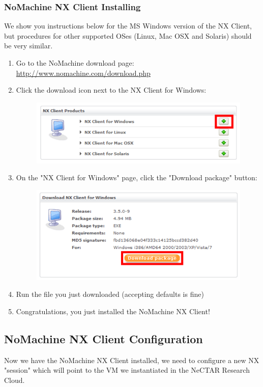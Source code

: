 \subsubsection{NoMachine NX Client Installing}
We show you instructions below for the MS Windows version of the NX Client, but
procedures for other supported OSes (Linux, Mac OSX and Solaris) should be very
similar.
\begin{enumerate}
  \item Go to the NoMachine download page: \url{http://www.nomachine.com/download.php}
  \item Click the download icon next to the NX Client for Windows:
  \begin{figure}[H]
    \centering
    \includegraphics[scale=0.5]{nx_client/download.png}
    \caption{\label{fig:nx_download}}
  \end{figure}
  \item On the "NX Client for Windows" page, click the "Download package" button:
  \begin{figure}[H]
    \centering
    \includegraphics[scale=0.5]{nx_client/download_package.png}
    \caption{\label{fig:nx_download_package}}
  \end{figure}
  \item Run the file you just downloaded (accepting defaults is fine)
  \item Congratulations, you just installed the NoMachine NX Client!
\end{enumerate}

\subsection{NoMachine NX Client Configuration}
Now we have the NoMachine NX Client installed, we need to configure a new NX
"session" which will point to the VM we instantiated in the NeCTAR Research
Cloud.

